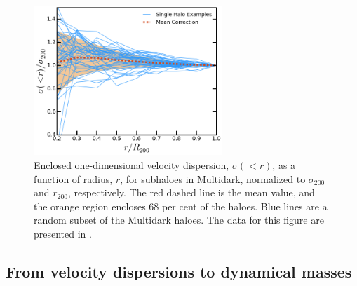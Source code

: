 \begin{figure}
\begin{minipage}[b]{2.8in}
 \centerline{\includegraphics[width=2.8in]{chapter3/veldisp_r_correction.png}}
\end{minipage}
\begin{minipage}[b]{2in}
 \caption{Enclosed one-dimensional velocity dispersion, $\sigma(<r)$, as a function of radius, $r$, for subhaloes in Multidark, normalized to $\sigma_{200}$ and $r_{200}$, respectively. The red dashed line is the mean value, and the orange region encloses 68 per cent of the haloes. Blue lines are a random subset of the Multidark haloes. The data for this figure are presented in .}
\label{f:correction}
\end{minipage}
\end{figure}


\subsection{From velocity dispersions to dynamical masses}
\label{s:scaling}

